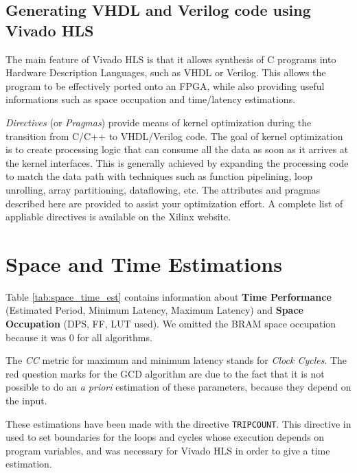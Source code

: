\subsection{Generating VHDL and Verilog code using Vivado HLS}

The main feature of Vivado HLS is that it allows synthesis of C programs into Hardware Description Languages, such as VHDL or Verilog. This allows the program to be effectively ported onto an FPGA, while also providing useful informations such as space occupation and time/latency estimations.

\textit{Directives} (or \textit{Pragmas}) provide means of kernel optimization during the transition from C/C++ to VHDL/Verilog code. The goal of kernel optimization is to create processing logic that can consume all the data as soon as it arrives at the kernel interfaces. This is generally achieved by expanding the processing code to match the data path with techniques such as function pipelining, loop unrolling, array partitioning, dataflowing, etc. The attributes and pragmas described here are provided to assist your optimization effort. A complete list of appliable directives is available on the Xilinx website\cite{xilinx_directives}.

\newpage

\section{Space and Time Estimations}
\label{sec:spacetime_estimations}

Table \ref{tab:space_time_est} contains information about \textbf{Time Performance} (Estimated Period, Minimum Latency, Maximum Latency) and \textbf{Space Occupation} (DPS, FF, LUT used). We omitted the BRAM space occupation because it was 0 for all algorithms.

The \textit{CC} metric for maximum and minimum latency stands for \textit{Clock Cycles}. The red question marks for the GCD algorithm are due to the fact that it is not possible to do an \textit{a priori} estimation of these parameters, because they depend on the input. 

These estimations have been made with the directive \texttt{TRIPCOUNT}. This directive in used to set boundaries for the loops and cycles whose execution depends on program variables, and was necessary for Vivado HLS in order to give a time estimation.


